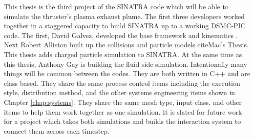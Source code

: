 \indent This thesis is the third project of the SINATRA code which will be able to simulate the thruster's plasma exhaust plume. The first three developers worked together in a staggered capacity to build SINATRA up to a working DSMC-PIC code. The first, David Galvez, developed the base framework and kinematics \cite{Galvez2018a}. Next Robert Alliston built up the collisions and particle models cite{Mac's Thesis}. This thesis adds charged particle simulation to SINATRA. At the same time as this thesis, Anthony Gay is building the fluid side simulation. Intentionally many things will be common between the codes. They are both written in C++ and are class based. They share the same process control items including the execution style, distribution method, and the other systems engineering items shown in Chapter \ref{chap:systems}. They share the same mesh type, input class, and other items to help them work together as one simulation. It is slated for future work for a project which takes both simulations and builds the interaction system to connect them across each timestep. 



